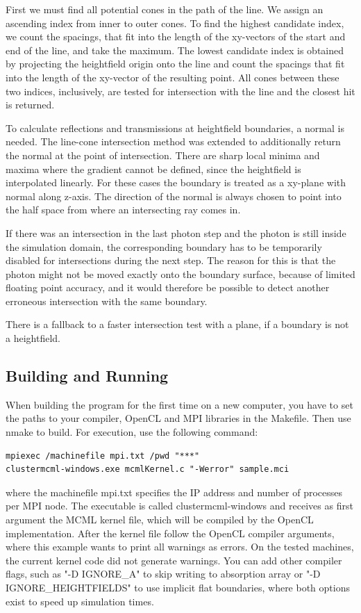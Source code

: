 \documentclass[]{article}
\begin{document}
First we must find all potential cones in the path of the line. We assign an ascending index from inner to outer cones. To find the highest candidate index, we count the spacings, that fit into the length of the xy-vectors of the start and end of the line, and take the maximum. The lowest candidate index is obtained by projecting the heightfield origin onto the line and count the spacings that fit into the length of the xy-vector of the resulting point. All cones between these two indices, inclusively, are tested for intersection with the line and the closest hit is returned.

To calculate reflections and transmissions at heightfield boundaries, a normal is needed. The line-cone intersection method was extended to additionally return the normal at the point of intersection. There are sharp local minima and maxima where the gradient cannot be defined, since the heightfield is interpolated linearly. For these cases the boundary is treated as a xy-plane with normal along z-axis. The direction of the normal is always chosen to point into the half space from where an intersecting ray comes in.

If there was an intersection in the last photon step and the photon is still inside the simulation domain, the corresponding boundary has to be temporarily disabled for intersections during the next step. The reason for this is that the photon might not be moved exactly onto the boundary surface, because of limited floating point accuracy, and it would therefore be possible to detect another erroneous intersection with the same boundary.

There is a fallback to a faster intersection test with a plane, if a boundary is not a heightfield.

\subsection{Building and Running}

When building the program for the first time on a new computer, you have to set the paths to your compiler, OpenCL and MPI libraries in the Makefile. Then use nmake to build. For execution, use the following command:

\begin{lstlisting}
mpiexec /machinefile mpi.txt /pwd "***"
clustermcml-windows.exe mcmlKernel.c "-Werror" sample.mci
\end{lstlisting}

where the machinefile mpi.txt specifies the IP address and number of processes per MPI node. The executable is called clustermcml-windows and receives as first argument the MCML kernel file, which will be compiled by the OpenCL implementation. After the kernel file follow the OpenCL compiler arguments, where this example wants to print all warnings as errors. On the tested machines, the current kernel code did not generate warnings. You can add other compiler flags, such as "-D IGNORE\_A" to skip writing to absorption array or "-D IGNORE\_HEIGHTFIELDS" to use implicit flat boundaries, where both options exist to speed up simulation times.
\end{document}
